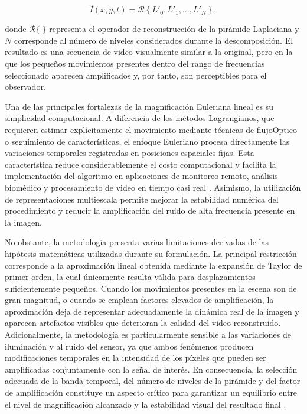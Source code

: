 \begin{equation}
\hat{I}(x,y,t)=\mathcal{R}\left\{L'_0,L'_1,\ldots,L'_N\right\},
\end{equation}

donde $\mathcal{R}\{\cdot\}$ representa el operador de reconstrucción de la pirámide Laplaciana y $N$ corresponde al número de niveles considerados durante la descomposición. El resultado es una secuencia de video visualmente similar a la original, pero en la que los pequeños movimientos presentes dentro del rango de frecuencias seleccionado aparecen amplificados y, por tanto, son perceptibles para el observador.

Una de las principales fortalezas de la magnificación Euleriana lineal es su simplicidad computacional. A diferencia de los métodos Lagrangianos, que requieren estimar explícitamente el movimiento mediante técnicas de \gls{flujoOptico} o seguimiento de características, el enfoque Euleriano procesa directamente las variaciones temporales registradas en posiciones espaciales fijas. Esta característica reduce considerablemente el costo computacional y facilita la implementación del algoritmo en aplicaciones de monitoreo remoto, análisis biomédico y procesamiento de video en tiempo casi real \cite{wu2012eulerian}. Asimismo, la utilización de representaciones multiescala permite mejorar la estabilidad numérica del procedimiento y reducir la amplificación del ruido de alta frecuencia presente en la imagen.

No obstante, la metodología presenta varias limitaciones derivadas de las hipótesis matemáticas utilizadas durante su formulación. La principal restricción corresponde a la aproximación lineal obtenida mediante la expansión de Taylor de primer orden, la cual únicamente resulta válida para desplazamientos suficientemente pequeños. Cuando los movimientos presentes en la escena son de gran magnitud, o cuando se emplean factores elevados de amplificación, la aproximación deja de representar adecuadamente la dinámica real de la imagen y aparecen artefactos visibles que deterioran la calidad del video reconstruido. Adicionalmente, la metodología es particularmente sensible a las variaciones de iluminación y al ruido del sensor, ya que ambos fenómenos producen modificaciones temporales en la intensidad de los píxeles que pueden ser amplificadas conjuntamente con la señal de interés. En consecuencia, la selección adecuada de la banda temporal, del número de niveles de la pirámide y del factor de amplificación constituye un aspecto crítico para garantizar un equilibrio entre el nivel de magnificación alcanzado y la estabilidad visual del resultado final \cite{ahmed2023overview}.

